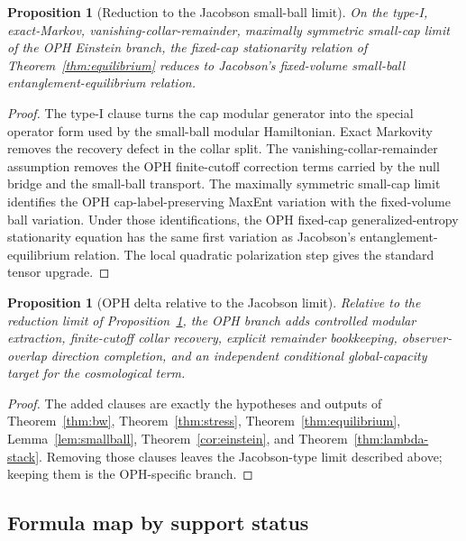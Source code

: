 \documentclass[11pt]{article}
\newtheorem{proposition}[theorem]{Proposition}
\begin{document}
\begin{proposition}[Reduction to the Jacobson small-ball limit]\label{prop:oph-jacobson-reduction}
On the type-I, exact-Markov, vanishing-collar-remainder, maximally symmetric small-cap limit of the
OPH Einstein branch, the fixed-cap stationarity relation of Theorem~\ref{thm:equilibrium} reduces
to Jacobson's fixed-volume small-ball entanglement-equilibrium relation.
\end{proposition}

\begin{proof}
The type-I clause turns the cap modular generator into the special operator form used by the
small-ball modular Hamiltonian. Exact Markovity removes the recovery defect in the collar split.
The vanishing-collar-remainder assumption removes the OPH finite-cutoff correction terms carried
by the null bridge and the small-ball transport. The maximally symmetric small-cap limit identifies
the OPH cap-label-preserving MaxEnt variation with the fixed-volume ball variation. Under those
identifications, the OPH fixed-cap generalized-entropy stationarity equation has the same first
variation as Jacobson's entanglement-equilibrium relation. The local quadratic
polarization step gives the standard tensor upgrade.
\end{proof}

\begin{proposition}[OPH delta relative to the Jacobson limit]\label{prop:oph-jacobson-delta}
Relative to the reduction limit of Proposition~\ref{prop:oph-jacobson-reduction}, the OPH branch
adds controlled modular extraction, finite-cutoff collar recovery, explicit remainder
bookkeeping, observer-overlap direction completion, and an independent conditional global-capacity
target for the cosmological term.
\end{proposition}

\begin{proof}
The added clauses are exactly the hypotheses and outputs of Theorem~\ref{thm:bw},
Theorem~\ref{thm:stress}, Theorem~\ref{thm:equilibrium}, Lemma~\ref{lem:smallball},
Theorem~\ref{cor:einstein}, and Theorem~\ref{thm:lambda-stack}. Removing those clauses leaves
the Jacobson-type limit described above; keeping them is the OPH-specific branch.
\end{proof}

\subsection*{Formula map by support status}
\end{document}
